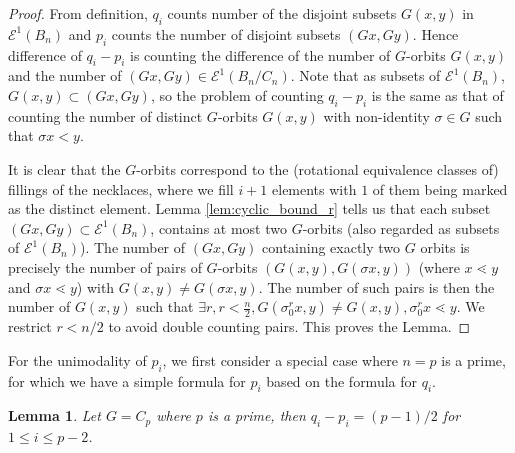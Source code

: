 \documentclass[10 pt]{amsart}
\theoremstyle{plain}
\newtheorem{lem}[thm]{Lemma}
\theoremstyle{definition}
\theoremstyle{remark}
\numberwithin{equation}{section}
\begin{document}
\begin{proof}
From definition, $q_i$ counts  number of the disjoint subsets $G(x, y)$ in $\mathcal E^1 (B_n)$ and $p_i$ counts the number of disjoint subsets $(Gx, Gy)$. Hence difference of $q_i - p_i$ is counting the difference of the number of $G$-orbits $G (x ,y)$ and the number of $(Gx,Gy) \in \mathcal E^1(B_n/C_n)$.  Note that as subsets of $\mathcal E^1 (B_n)$, $G(x, y) \subset (Gx, Gy)$, so the problem of counting $q_i - p_i$ is the same as that of counting the number of distinct $G$-orbits $G(x , y)$  with non-identity $\sigma \in G$ such that $\sigma x < y$. 


It is clear that the $G$-orbits correspond to the (rotational equivalence classes of) fillings of the necklaces, where we fill $i+1$ elements with $1$ of them being marked as the distinct element. Lemma \ref{lem:cyclic_bound_r} tells us that each subset $(Gx, Gy) \subset \mathcal E^1 (B_n)$, contains at most two $G$-orbits (also regarded as subsets of $\mathcal E^1 (B_n)$). The number of $(Gx, Gy)$ containing exactly two $G$ orbits is precisely the number of pairs of $G$-orbits $(G (x, y),G(\sigma x, y ))$ (where $ x \lessdot y$ and $\sigma x \lessdot y$) with $G(x, y) \neq G(\sigma x, y).$ The number of such pairs is then the number of $G(x, y)$ such that $ \exists r,r<\frac n 2, G(\sigma_0^r x, y)\neq G(x, y),\sigma_0^r x \lessdot y.$ We restrict $r < n/2$ to avoid double counting pairs. This proves the Lemma.
\end{proof}

For the unimodality of $p_i$, we first consider a special case where $n = p$ is a prime, for which we have a simple formula for $p_i$ based on the formula for $q_i$.

\begin{lem}{\label{lem:cyclicprime}}
Let $G = C_p$ where $p$ is a prime, then $q_i - p_i = (p-1)/2$ for $ 1 \le i \le p-2$. 
\end{lem}
\end{document}
